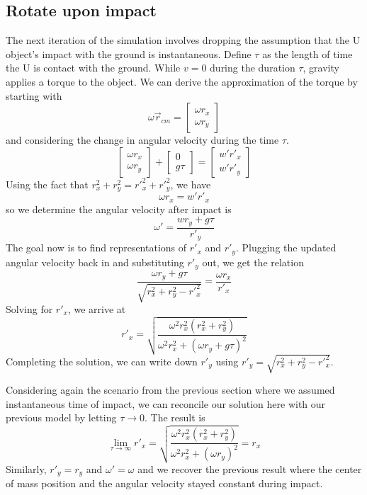 \documentclass{article}
\begin{document}
\subsection{Rotate upon impact}
The next iteration of the simulation involves dropping the assumption that the U object's impact with the ground is instantaneous. Define $\tau$ as the length of time the U is contact with the ground. While $v = 0$ during the duration $\tau$, gravity applies a torque to the object. We can derive the approximation of the torque by starting with
\begin{equation}
    \omega \vec{r}_{cm} = 
    \begin{bmatrix}
        \omega r_x \\
        \omega r_y
    \end{bmatrix}
\end{equation}
and considering the change in angular velocity during the time $\tau$. 
\begin{equation}
    \begin{bmatrix}
        \omega r_x \\
        \omega r_y
    \end{bmatrix}
    + 
    \begin{bmatrix}
        0 \\
        g \tau 
    \end{bmatrix}
    =
    \begin{bmatrix}
        w' r'_x \\
        w' r'_y
    \end{bmatrix}
\end{equation}
Using the fact that $r^2_x + r^2_y = r'^2_x + r'^2_y$, we have
\begin{equation}
    \omega r_x = w' r'_x
\end{equation}
so we determine the angular velocity after impact is
\begin{equation}
    \omega' = \frac{w r_y + g \tau}{r'_y}
\end{equation}
The goal now is to find representations of $r'_x$ and $r'_y$. Plugging the updated angular velocity back in and substituting $r'_y$ out, we get the relation
\begin{equation}
    \frac{\omega r_y + g \tau}{\sqrt{r^2_x + r^2_y - r'^2_x}} = \frac{\omega r_x}{r'_x}
\end{equation}
Solving for $r'_x$, we arrive at
\begin{equation}
    r'_x = \sqrt{\frac{\omega^2 r^2_x (r^2_x + r^2_y)}{\omega^2 r^2_x + (\omega r_y + g \tau)^2}}
\end{equation}
Completing the solution, we can write down $r'_y$ using $r'_y = \sqrt{r^2_x + r^2_y - r'^2_x}$.

Considering again the scenario from the previous section where we assumed instantaneous time of impact, we can reconcile our solution here with our previous model by letting $\tau \rightarrow 0$. The result is
\[ \lim_{\tau\to\infty} r'_x = \sqrt{\frac{\omega^2 r^2_x (r^2_x + r^2_y)}{\omega^2 r^2_x + (\omega r_y)^2}} = r_x \]
Similarly, $r'_y = r_y$ and $\omega' = \omega$ and we recover the previous result where the center of mass position and the angular velocity stayed constant during impact.
\end{document}
